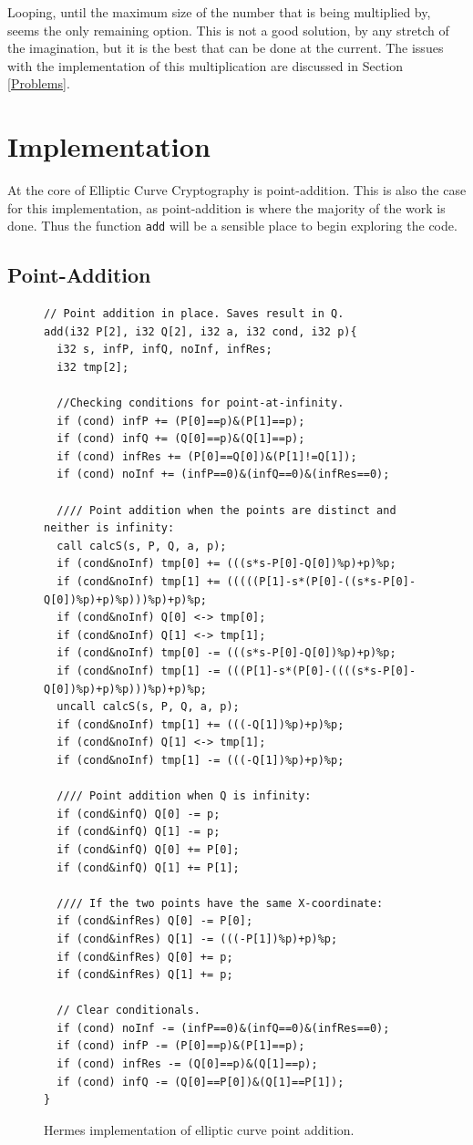 Looping, until the maximum size of the number that is being multiplied by, seems the only remaining option. This is not a good solution, by any stretch of the imagination, but it is the best that can be done at the current. The issues with the implementation of this multiplication are discussed in Section \ref{Problems}. 

\section{Implementation}
\label{ellipticImplementation}
At the core of Elliptic Curve Cryptography is point-addition. This is also the case for this implementation, as point-addition is where the majority of the work is done. Thus the function \texttt{add} will be a sensible place to begin exploring the code.
\subsection{Point-Addition}
\label{PointAdd}
\begin{figure}[H]
\begin{Verbatim}
// Point addition in place. Saves result in Q. 
add(i32 P[2], i32 Q[2], i32 a, i32 cond, i32 p){
  i32 s, infP, infQ, noInf, infRes;
  i32 tmp[2];
  
  //Checking conditions for point-at-infinity. 
  if (cond) infP += (P[0]==p)&(P[1]==p);
  if (cond) infQ += (Q[0]==p)&(Q[1]==p);
  if (cond) infRes += (P[0]==Q[0])&(P[1]!=Q[1]);
  if (cond) noInf += (infP==0)&(infQ==0)&(infRes==0);
  
  //// Point addition when the points are distinct and neither is infinity:
  call calcS(s, P, Q, a, p);
  if (cond&noInf) tmp[0] += (((s*s-P[0]-Q[0])%p)+p)%p;
  if (cond&noInf) tmp[1] += (((((P[1]-s*(P[0]-((s*s-P[0]-Q[0])%p)+p)%p)))%p)+p)%p;    
  if (cond&noInf) Q[0] <-> tmp[0];
  if (cond&noInf) Q[1] <-> tmp[1];
  if (cond&noInf) tmp[0] -= (((s*s-P[0]-Q[0])%p)+p)%p;
  if (cond&noInf) tmp[1] -= (((P[1]-s*(P[0]-((((s*s-P[0]-Q[0])%p)+p)%p)))%p)+p)%p;  
  uncall calcS(s, P, Q, a, p);                
  if (cond&noInf) tmp[1] += (((-Q[1])%p)+p)%p;
  if (cond&noInf) Q[1] <-> tmp[1];            
  if (cond&noInf) tmp[1] -= (((-Q[1])%p)+p)%p;
  
  //// Point addition when Q is infinity:
  if (cond&infQ) Q[0] -= p;
  if (cond&infQ) Q[1] -= p;
  if (cond&infQ) Q[0] += P[0];
  if (cond&infQ) Q[1] += P[1];
  
  //// If the two points have the same X-coordinate:
  if (cond&infRes) Q[0] -= P[0];
  if (cond&infRes) Q[1] -= (((-P[1])%p)+p)%p;
  if (cond&infRes) Q[0] += p;
  if (cond&infRes) Q[1] += p;
  
  // Clear conditionals. 
  if (cond) noInf -= (infP==0)&(infQ==0)&(infRes==0);   
  if (cond) infP -= (P[0]==p)&(P[1]==p);
  if (cond) infRes -= (Q[0]==p)&(Q[1]==p);
  if (cond) infQ -= (Q[0]==P[0])&(Q[1]==P[1]);
}
\end{Verbatim}
\caption{Hermes implementation of elliptic curve point addition.}
\end{figure}
